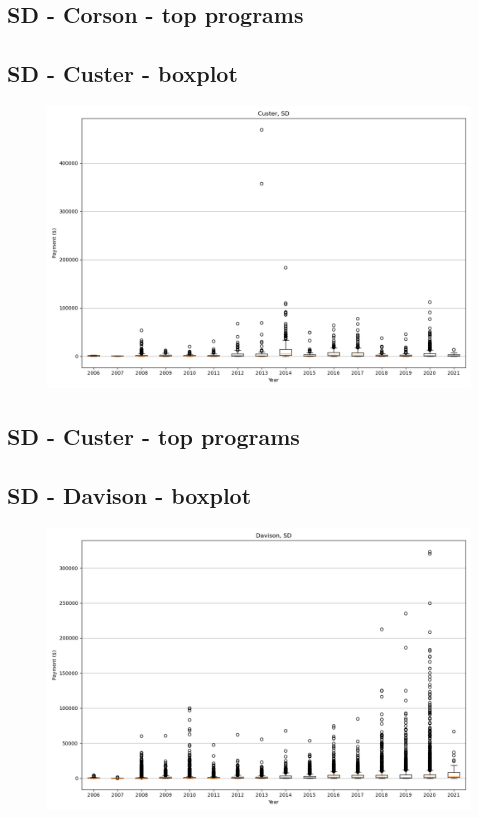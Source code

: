 \subsection*{SD - Corson - top programs}

\newpage
\subsection*{SD - Custer - boxplot}
\begin{figure}[h]
\centering
\includegraphics[width=7in]{../output/boxplots/counties/Custer-SD_boxplot.png}
\end{figure}


\subsection*{SD - Custer - top programs}

\newpage
\subsection*{SD - Davison - boxplot}
\begin{figure}[h]
\centering
\includegraphics[width=7in]{../output/boxplots/counties/Davison-SD_boxplot.png}
\end{figure}


